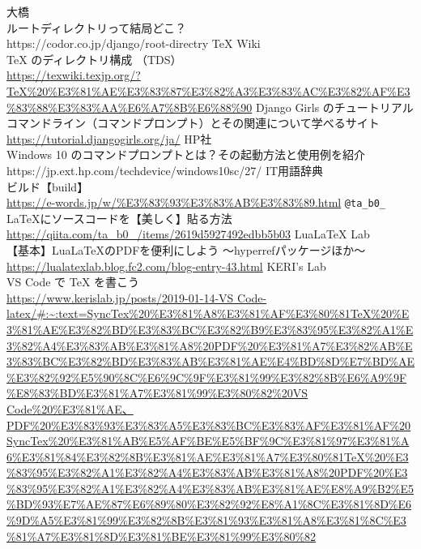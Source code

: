 \documentclass{ltjsarticle}
\begin{document}
\begin{thebibliography}{999}
  大橋\\
  ルートディレクトリって結局どこ？\\
  https://codor.co.jp/django/root-directry
  TeX Wiki\\
  TeX のディレクトリ構成 （TDS） \\
  \url{https://texwiki.texjp.org/?TeX%20%E3%81%AE%E3%83%87%E3%82%A3%E3%83%AC%E3%82%AF%E3%83%88%E3%83%AA%E6%A7%8B%E6%88%90}
  Django Girls のチュートリアル\\
  コマンドライン（コマンドプロンプト）とその関連について学べるサイト\\
  \url{https://tutorial.djangogirls.org/ja/}
  HP社\\
  Windows 10 のコマンドプロンプトとは？その起動方法と使用例を紹介\\
  https://jp.ext.hp.com/techdevice/windows10sc/27/
  IT用語辞典\\
  ビルド【build】\\
  \url{https://e-words.jp/w/%E3%83%93%E3%83%AB%E3%83%89.html}
  \verb|@ta_b0_|\\
  LaTeXにソースコードを【美しく】貼る方法\\
  \url{https://qiita.com/ta_b0_/items/2619d5927492edbb5b03}
  LuaLaTeX Lab\\
  【基本】LuaLaTeXのPDFを便利にしよう ～hyperrefパッケージほか～\\
  \url{https://lualatexlab.blog.fc2.com/blog-entry-43.html}
  KERI's Lab\\
  VS Code で TeX を書こう\\
  \url{https://www.kerislab.jp/posts/2019-01-14-VS Code-latex/#:~:text=SyncTex%20%E3%81%A8%E3%81%AF%E3%80%81TeX%20%E3%81%AE%E3%82%BD%E3%83%BC%E3%82%B9%E3%83%95%E3%82%A1%E3%82%A4%E3%83%AB%E3%81%A8%20PDF%20%E3%81%A7%E3%82%AB%E3%83%BC%E3%82%BD%E3%83%AB%E3%81%AE%E4%BD%8D%E7%BD%AE%E3%82%92%E5%90%8C%E6%9C%9F%E3%81%99%E3%82%8B%E6%A9%9F%E8%83%BD%E3%81%A7%E3%81%99%E3%80%82%20VS Code%20%E3%81%AE、PDF%20%E3%83%93%E3%83%A5%E3%83%BC%E3%83%AF%E3%81%AF%20SyncTex%20%E3%81%AB%E5%AF%BE%E5%BF%9C%E3%81%97%E3%81%A6%E3%81%84%E3%82%8B%E3%81%AE%E3%81%A7%E3%80%81TeX%20%E3%83%95%E3%82%A1%E3%82%A4%E3%83%AB%E3%81%A8%20PDF%20%E3%83%95%E3%82%A1%E3%82%A4%E3%83%AB%E3%81%AE%E8%A9%B2%E5%BD%93%E7%AE%87%E6%89%80%E3%82%92%E8%A1%8C%E3%81%8D%E6%9D%A5%E3%81%99%E3%82%8B%E3%81%93%E3%81%A8%E3%81%8C%E3%81%A7%E3%81%8D%E3%81%BE%E3%81%99%E3%80%82}

\end{thebibliography}
\end{document}
